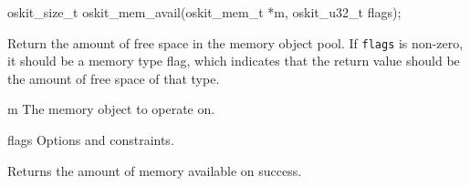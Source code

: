 \begin{apisyn}

	\funcproto oskit_size_t
			oskit_mem_avail(oskit_mem_t *m, oskit_u32_t flags);
\end{apisyn}
\begin{apidesc}
	 Return the amount of free space in the memory object pool.  If
	 \texttt{flags} is non-zero, it should be a memory type flag, which
	 indicates that the return value should be the amount of free space
	 of that type.
\end{apidesc}
\begin{apiparm}
	\item[m]
		The memory object to operate on.
	\item[flags]
		Options and constraints.
\end{apiparm}
\begin{apiret}
	Returns the amount of memory available on success.
\end{apiret}

